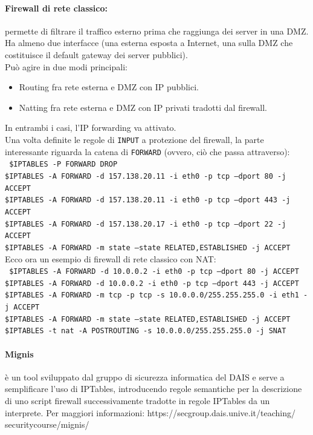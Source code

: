 \documentclass[a4paper]{report}
\newcommand\tab[1][1cm]{\hspace*{#1}}
\begin{document}
\paragraph{Firewall di rete classico:} permette di filtrare il traffico esterno prima che raggiunga dei server in una DMZ. Ha almeno due interfacce (una esterna esposta a Internet, una sulla DMZ che costituisce il default gateway dei server pubblici).\\
Può agire in due modi principali:
\begin{itemize}
\item Routing fra rete esterna e DMZ con IP pubblici.
\item Natting fra rete esterna e DMZ con IP privati tradotti dal firewall.
\end{itemize}
In entrambi i casi, l'IP forwarding va attivato.\\
Una volta definite le regole di \texttt{INPUT} a protezione del firewall, la parte interessante riguarda la catena di \texttt{FORWARD} (ovvero, ciò che passa attraverso):\\
\texttt{
\tab\$IPTABLES -P FORWARD DROP\\
\tab\$IPTABLES -A FORWARD -d 157.138.20.11 -i eth0 -p tcp --dport 80 -j ACCEPT\\
\tab\$IPTABLES -A FORWARD -d 157.138.20.11 -i eth0 -p tcp --dport 443 -j ACCEPT\\
\tab\$IPTABLES -A FORWARD -d 157.138.20.17 -i eth0 -p tcp --dport 22 -j ACCEPT\\
\tab\$IPTABLES -A FORWARD -m state --state RELATED,ESTABLISHED -j ACCEPT
}\\
Ecco ora un esempio di firewall di rete classico con NAT:\\
\texttt{
\tab\$IPTABLES -A FORWARD -d 10.0.0.2 -i eth0 -p tcp --dport 80 -j ACCEPT\\
\tab\$IPTABLES -A FORWARD -d 10.0.0.2 -i eth0 -p tcp --dport 443 -j ACCEPT\\
\tab\$IPTABLES -A FORWARD -m tcp -p tcp -s 10.0.0.0/255.255.255.0 -i eth1 -j ACCEPT\\
\tab\$IPTABLES -A FORWARD -m state --state RELATED,ESTABLISHED -j ACCEPT\\
\tab\$IPTABLES -t nat -A POSTROUTING -s 10.0.0.0/255.255.255.0 -j SNAT\\}
\paragraph{Mignis} è un tool sviluppato dal gruppo di sicurezza informatica del DAIS e serve a semplificare l'uso di IPTables, introducendo regole semantiche per la descrizione di uno script firewall successivamente tradotte in regole IPTables da un interprete. Per maggiori informazioni: https://secgroup.dais.unive.it/teaching/\\securitycourse/mignis/
\end{document}
